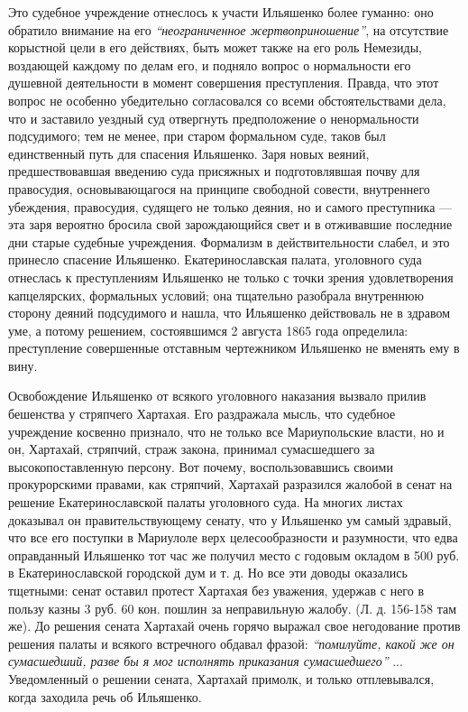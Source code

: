 \documentclass[a4paper,20pt]{report}
\begin{document}
Это судебное учреждение отнеслось к участи
Ильяшенко более гуманно: оно обратило внимание на его
\emph{``неограниченное жертвоприношение''}, на отсутствие корыстной
цели в его действиях, быть может также на его роль
Немезиды, воздающей каждому по делам его, и подняло
вопрос о нормальности его душевной деятельности в момент совершения преступления.
Правда, что этот вопрос не особенно убедительно согласовался со всеми обстоятельствами дела,
что и заставило уездный суд отвергнуть предположение о ненормальности подсудимого; тем не менее,
при старом формальном суде, таков был единственный
путь для спасения Ильяшенко. Заря новых веяний, предшествовавшая 
введению суда присяжных и подготовлявшая
почву для правосудия, основывающагося на принципе свободной совести, 
внутреннего убеждения, правосудия, судящего
не только деяния, но и самого преступника — эта заря вероятно бросила
свой зарождающийся свет и в отживавшие
последние дни старые судебные учреждения. Формализм в
действительности слабел, и это принесло спасение Ильяшенко.
Екатеринославская палата, уголовного суда отнеслась
к преступлениям Ильяшенко не только с точки зрения
удовлетворения капцелярских, формальных условий; она
тщательно разобрала внутреннюю сторону деяний подсудимого
и нашла, что Ильяшенко действоваль не в здравом уме,
а потому решением, состоявшимся 2 августа 1865 года
определила: преступление совершенные отставным чертежником
Ильяшенко не вменять ему в вину.

Освобождение Ильяшенко от всякого уголовного наказания 
вызвало прилив бешенства у стряпчего Хартахая.
Его раздражала мысль, что судебное учреждение косвенно
признало, что не только все Мариупольские власти, но и
он, Хартахай, стряпчий, страж закона, принимал сумасшедшего за высокопоставленную персону. 
Вот почему, воспользовавшись своими прокурорскими правами, как стряпчий, Хартахай
разразился жалобой в сенат на решение 
Екатеринославской палаты уголовного суда. На многих
листах доказывал он правительствующему сенату, что у
Ильяшенко ум самый здравый, что все его поступки в
Мариулоле верх целесообразности и разумности, что едва
оправданный Ильяшенко тот час же получил место с годовым окладом в 500 руб.
в Екатеринославской городской дум и т. д. Но все эти доводы оказались тщетными:
сенат оставил протест Хартахая без уважения, удержав
с него в пользу казны 3 руб. 60 кон. пошлин за неправильную жалобу. (Л. д. 156-158 там же). До решения
сената Хартахай очень горячо выражал свое негодование
против решения палаты и всякого встречного обдавал
фразой: \emph{``помилуйте, какой же он сумасшедший, разве бы
я мог исполнять приказания сумасшедшего''} ... Уведомленный о решении сената, Хартахай примолк, 
и только отплевывался, когда заходила речь об Ильяшенко.
\end{document}
